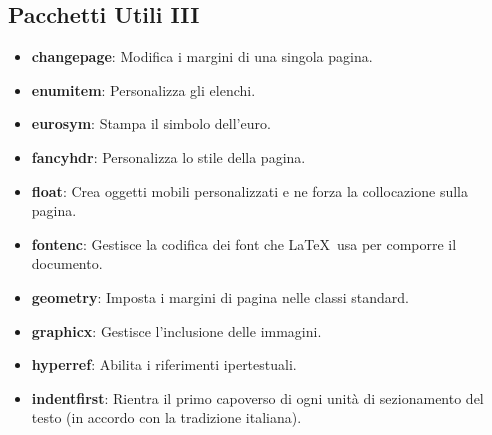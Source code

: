 \documentclass{article}
\begin{document}
            \subsection{Pacchetti Utili III}
                \begin{itemize}
                    \item \textbf{changepage}: Modifica i margini di una singola pagina.
                    \item \textbf{enumitem}: Personalizza gli elenchi.
                    \item \textbf{eurosym}: Stampa il simbolo dell'euro.
                    \item \textbf{fancyhdr}: Personalizza lo stile della pagina.
                    \item \textbf{float}: Crea oggetti mobili personalizzati e ne forza la collocazione sulla pagina.
                    \item \textbf{fontenc}: Gestisce la codifica dei font che \LaTeX\ usa per comporre il documento.
                    \item \textbf{geometry}: Imposta i margini di pagina nelle classi standard.
                    \item \textbf{graphicx}: Gestisce l'inclusione delle immagini.
                    \item \textbf{hyperref}: Abilita i riferimenti ipertestuali.
                    \item \textbf{indentfirst}: Rientra il primo capoverso di ogni unità di sezionamento del testo (in accordo con la tradizione italiana).
                \end{itemize}
\end{document}
